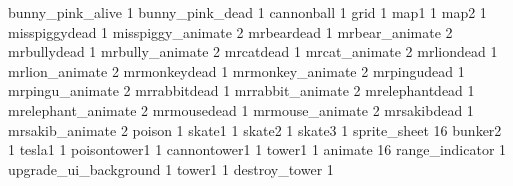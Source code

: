 bunny_pink_alive 1
bunny_pink_dead 1
cannonball 1
grid 1
map1 1
map2 1
misspiggydead 1
misspiggy_animate 2
mrbeardead 1
mrbear_animate 2
mrbullydead 1
mrbully_animate 2
mrcatdead 1
mrcat_animate 2
mrliondead 1
mrlion_animate 2
mrmonkeydead 1
mrmonkey_animate 2
mrpingudead 1
mrpingu_animate 2
mrrabbitdead 1
mrrabbit_animate 2
mrelephantdead 1
mrelephant_animate 2
mrmousedead 1
mrmouse_animate 2
mrsakibdead 1
mrsakib_animate 2
poison 1
skate1 1
skate2 1
skate3 1
sprite_sheet 16
bunker2 1
tesla1 1
poisontower1 1
cannontower1 1
tower1 1
animate 16
range_indicator 1
upgrade_ui_background 1
tower1 1
destroy_tower 1

